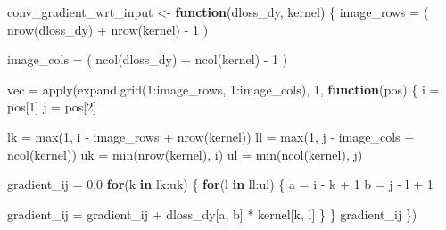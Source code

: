 \documentclass[
  a4paper,
]{article}
\newenvironment{Shaded}{\begin{snugshade}}{\end{snugshade}}
\newcommand{\ControlFlowTok}[1]{\textcolor[rgb]{0.13,0.29,0.53}{\textbf{#1}}}
\newcommand{\DecValTok}[1]{\textcolor[rgb]{0.00,0.00,0.81}{#1}}
\newcommand{\FloatTok}[1]{\textcolor[rgb]{0.00,0.00,0.81}{#1}}
\newcommand{\FunctionTok}[1]{\textcolor[rgb]{0.00,0.00,0.00}{#1}}
\newcommand{\NormalTok}[1]{#1}
\newcommand{\OtherTok}[1]{\textcolor[rgb]{0.56,0.35,0.01}{#1}}
\newcommand{\SpecialCharTok}[1]{\textcolor[rgb]{0.00,0.00,0.00}{#1}}
\begin{document}
\begin{Shaded}
\begin{Highlighting}[]
\NormalTok{conv\_gradient\_wrt\_input }\OtherTok{\textless{}{-}} \ControlFlowTok{function}\NormalTok{(dloss\_dy, kernel) \{}
\NormalTok{  image\_rows }\OtherTok{=}\NormalTok{ (}
    \FunctionTok{nrow}\NormalTok{(dloss\_dy) }\SpecialCharTok{+} \FunctionTok{nrow}\NormalTok{(kernel) }\SpecialCharTok{{-}} \DecValTok{1}
\NormalTok{  )}
  
\NormalTok{  image\_cols }\OtherTok{=}\NormalTok{ (}
    \FunctionTok{ncol}\NormalTok{(dloss\_dy) }\SpecialCharTok{+} \FunctionTok{ncol}\NormalTok{(kernel) }\SpecialCharTok{{-}} \DecValTok{1}
\NormalTok{  )}

\NormalTok{  vec }\OtherTok{=} \FunctionTok{apply}\NormalTok{(}\FunctionTok{expand.grid}\NormalTok{(}\DecValTok{1}\SpecialCharTok{:}\NormalTok{image\_rows, }\DecValTok{1}\SpecialCharTok{:}\NormalTok{image\_cols), }\DecValTok{1}\NormalTok{, }\ControlFlowTok{function}\NormalTok{(pos) \{}
\NormalTok{    i }\OtherTok{=}\NormalTok{ pos[}\DecValTok{1}\NormalTok{]}
\NormalTok{    j }\OtherTok{=}\NormalTok{ pos[}\DecValTok{2}\NormalTok{]}

\NormalTok{    lk }\OtherTok{=} \FunctionTok{max}\NormalTok{(}\DecValTok{1}\NormalTok{, i }\SpecialCharTok{{-}}\NormalTok{ image\_rows }\SpecialCharTok{+} \FunctionTok{nrow}\NormalTok{(kernel))}
\NormalTok{    ll }\OtherTok{=} \FunctionTok{max}\NormalTok{(}\DecValTok{1}\NormalTok{, j }\SpecialCharTok{{-}}\NormalTok{ image\_cols }\SpecialCharTok{+} \FunctionTok{ncol}\NormalTok{(kernel))}
\NormalTok{    uk }\OtherTok{=} \FunctionTok{min}\NormalTok{(}\FunctionTok{nrow}\NormalTok{(kernel), i)}
\NormalTok{    ul }\OtherTok{=} \FunctionTok{min}\NormalTok{(}\FunctionTok{ncol}\NormalTok{(kernel), j)}
    
\NormalTok{    gradient\_ij }\OtherTok{=} \FloatTok{0.0}
    \ControlFlowTok{for}\NormalTok{(k }\ControlFlowTok{in}\NormalTok{ lk}\SpecialCharTok{:}\NormalTok{uk) \{}
      \ControlFlowTok{for}\NormalTok{(l }\ControlFlowTok{in}\NormalTok{ ll}\SpecialCharTok{:}\NormalTok{ul) \{}
\NormalTok{        a }\OtherTok{=}\NormalTok{ i }\SpecialCharTok{{-}}\NormalTok{ k }\SpecialCharTok{+} \DecValTok{1}
\NormalTok{        b }\OtherTok{=}\NormalTok{ j }\SpecialCharTok{{-}}\NormalTok{ l }\SpecialCharTok{+} \DecValTok{1}
        
\NormalTok{        gradient\_ij }\OtherTok{=}\NormalTok{ gradient\_ij }\SpecialCharTok{+}\NormalTok{ dloss\_dy[a, b] }\SpecialCharTok{*}\NormalTok{ kernel[k, l]}
\NormalTok{      \}}
\NormalTok{    \}}
\NormalTok{    gradient\_ij}
\NormalTok{  \})}
  

\end{Highlighting}
\end{Shaded}
\end{document}
